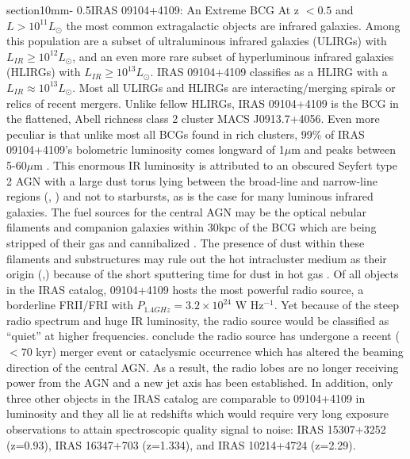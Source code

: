 \documentclass[letterpaper,11pt,twocolumn]{article}
\makeatletter
\renewcommand{\section}{\@startsection%
{section}{1}{0mm}{-\baselineskip}%
{0.5\baselineskip}{\normalfont\Large\bfseries}}%
\makeatother
\begin{document}
\section{IRAS 09104+4109: An Extreme BCG}
At z $< 0.5$ and $L > 10^{11} L_{\odot}$ the most common extragalactic
objects are infrared galaxies. Among this population are a subset
of ultraluminous infrared galaxies (ULIRGs) with $L_{IR} \geq 10^{12} L_{\odot}$,
and an even more rare subset of hyperluminous infrared galaxies
(HLIRGs) with $L_{IR} \geq 10^{13} L_{\odot}$. IRAS 09104+4109
classifies as a HLIRG with a $L_{IR} \approx 10^{13} L_{\odot}$. Most all ULIRGs and
HLIRGs are interacting/merging spirals or relics of recent
mergers. Unlike fellow HLIRGs, IRAS 09104+4109 is the BCG in
the flattened, Abell richness class 2 cluster MACS J0913.7+4056. Even more
peculiar is that unlike most all BCGs found in rich clusters, 99\% of
IRAS 09104+4109's bolometric luminosity comes longward of 1$\mu$m and peaks between
5-60$\mu$m \cite{1988ApJ...328..161K}. This enormous IR luminosity is
attributed to an obscured Seyfert type 2 AGN with a large dust torus
lying between the broad-line and narrow-line regions
(\cite{1993ApJ...415...82H}, \cite{1999ApJ...512..145H}) and not to
starbursts, as is the case for many luminous infrared galaxies.
The fuel sources for the central AGN may be the optical nebular 
filaments and companion galaxies within 30kpc
of the BCG which are being stripped of their gas and cannibalized
\cite{1999Ap&SS.266..113A}. The presence of dust
within these filaments and substructures may rule out the hot intracluster
medium as their origin (\cite{2000AJ....120..562T},\cite{1993ApJ...414L..17D}) because
of the short sputtering time for dust in hot gas \cite{1979ApJ...231...77D}. Of all
objects in the IRAS catalog, 09104+4109 hosts the most powerful radio
source, a borderline FRII/FRI with $P_{1.4GHz} = 3.2\times10^{24}$ W
Hz$^{-1}$. Yet because of the steep radio spectrum and huge IR luminosity, 
the radio source would be classified as ``quiet''
at higher frequencies. \cite{1999ApJ...512..145H} conclude
the radio source has undergone a recent ($< 70$ kyr) merger event or cataclysmic
occurrence which has altered the beaming direction of the central
AGN. As a result, the radio lobes are no longer receiving
power from the AGN and a new jet axis has been established. In
addition, only three other objects in the IRAS catalog are comparable
to 09104+4109 in luminosity and
they all lie at redshifts which would require very long exposure
observations to attain spectroscopic quality signal to noise: IRAS
15307+3252 (z=0.93), IRAS 16347+703 (z=1.334),
and IRAS 10214+4724 (z=2.29).
\end{document}

